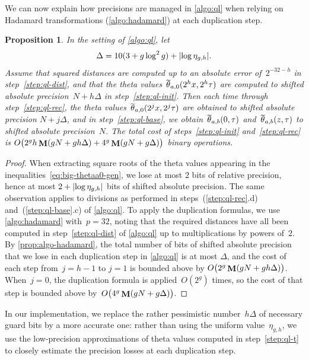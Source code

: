 \documentclass[12pt,oneside]{amsart}
\numberwithin{equation}{section}
\newtheorem{prop}[equation]{Proposition}
\theoremstyle{definition}
\DeclareMathOperator{\thetatilde}{\rlap{\raisebox{-0.1ex}{$\widetilde{\phantom{\,t}}$}}\theta}
\DeclareMathOperator{\Mul}{\mathbf{M}}
\DeclarePairedDelimiter{\abs}{|}{|}
\DeclarePairedDelimiter{\paren}{(}{)}
\begin{document}
We can now explain how precisions are managed in \cref{algo:ql} when relying on
Hadamard transformations (\cref{algo:hadamard}) at each duplication step.

\begin{prop}
  \label{prop:ql-precisions}
  In the setting of \cref{algo:ql},
  let
  \begin{displaymath}
    \Delta = 10(3 + g\log^2 g) + \abs{\log \eta_{g,h}}.
  \end{displaymath}
  Assume that squared distances are computed up to an absolute error
  of~$2^{-32-h}$ in step~\eqref{step:ql-dist}, and that the theta
  values~$\thetatilde_{a,0}(2^hx, 2^h\tau)$ are computed to shifted absolute
  precision~$N + h\Delta$ in step~\eqref{step:ql-init}. Then each time through
  step~\eqref{step:ql-rec}, the theta values~$\thetatilde_{a,0}(2^jx,2^j\tau)$
  are obtained to shifted absolute precision $N + j\Delta$, and in
  step~\eqref{step:ql-base}, we obtain~$\thetatilde_{a,b}(0,\tau)$
  and~$\thetatilde_{a,b}(z,\tau)$ to shifted absolute precision~$N$. The total
  cost of steps~\eqref{step:ql-init} and~\eqref{step:ql-rec} is
  $O\paren[\big]{2^g h \Mul(gN + g h \Delta) + 4^g \Mul(gN + g\Delta)}$ binary operations.
\end{prop}

\begin{proof}
  When extracting square roots of the theta values appearing in the
  inequalities~\eqref{eq:big-thetaa0-gen}, we lose at most $2$ bits of relative
  precision, hence at most $2 + \abs{\log\eta_{g,h}}$ bits of shifted absolute
  precision. The same observation applies to divisions as performed in
  steps~(\ref{step:ql-rec}.d) and~(\ref{step:ql-base}.c) of \cref{algo:ql}. To
  apply the duplication formulas, we use \cref{algo:hadamard} with~$p = 32$,
  noting that the required distances have all been computed in
  step~\eqref{step:ql-dist} of \cref{algo:ql} up to multiplications by powers
  of~$2$. By \cref{prop:algo-hadamard}, the total number of bits of shifted
  absolute precision that we lose in each duplication step in \cref{algo:ql} is
  at most $\Delta$, and the cost of each step from~$j = h-1$ to $j=1$ is
  bounded above by $O\paren[\big]{2^g \Mul(gN + gh\Delta)}$. When~$j=0$, the
  duplication formula is applied~$O(2^g)$ times, so the cost of that step is
  bounded above by~$O\paren[\big]{4^g \Mul(gN + g\Delta)}$.
\end{proof}

In our implementation, we replace the rather pessimistic number~$h\Delta$ of
necessary guard bits by a more accurate one: rather than using the uniform
value~$\eta_{g,h}$, we use the low-precision approximations of theta values
computed in step~\eqref{step:ql-t} to closely estimate the precision losses at
each duplication step.
\end{document}
